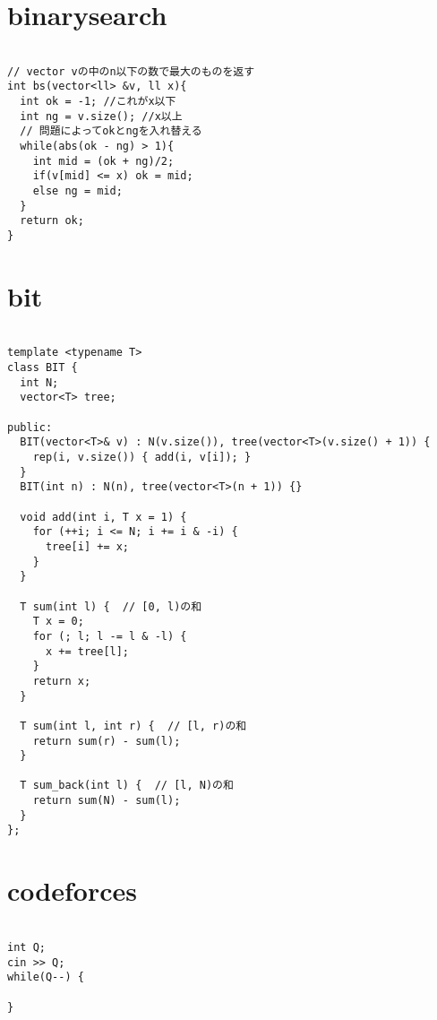 \documentclass[a4j,titlepage]{jarticle} %
\begin{document}
\color{white}
\section{binarysearch}
\color{black}
\begin{lstlisting}[caption=binarysearch]

// vector vの中のn以下の数で最大のものを返す
int bs(vector<ll> &v, ll x){
  int ok = -1; //これがx以下 
  int ng = v.size(); //x以上 
  // 問題によってokとngを入れ替える
  while(abs(ok - ng) > 1){
    int mid = (ok + ng)/2;
    if(v[mid] <= x) ok = mid;
    else ng = mid;
  }
  return ok;
}

\end{lstlisting}

\color{white}
\section{bit}
\color{black}
\begin{lstlisting}[caption=bit]

template <typename T>
class BIT {
  int N;
  vector<T> tree;

public:
  BIT(vector<T>& v) : N(v.size()), tree(vector<T>(v.size() + 1)) {
    rep(i, v.size()) { add(i, v[i]); }
  }
  BIT(int n) : N(n), tree(vector<T>(n + 1)) {}

  void add(int i, T x = 1) {
    for (++i; i <= N; i += i & -i) {
      tree[i] += x;
    }
  }

  T sum(int l) {  // [0, l)の和
    T x = 0;
    for (; l; l -= l & -l) {
      x += tree[l];
    }
    return x;
  }

  T sum(int l, int r) {  // [l, r)の和
    return sum(r) - sum(l);
  }

  T sum_back(int l) {  // [l, N)の和
    return sum(N) - sum(l);
  }
};

\end{lstlisting}

\color{white}
\section{codeforces}
\color{black}
\begin{lstlisting}[caption=codeforces]

int Q;
cin >> Q;
while(Q--) {
  
}

\end{lstlisting}

\color{white}
\end{document}
